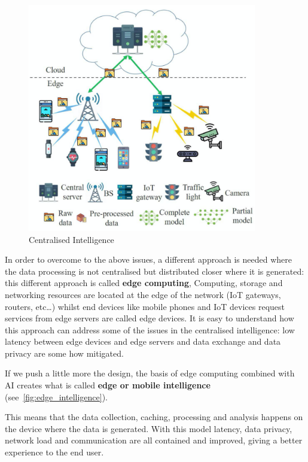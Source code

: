 \begin{figure}[ht]
    \includegraphics[width=10cm]{images/introduction/centralised_intelligence.png}
    \centering
    \caption{Centralised Intelligence}\label{fig:centralised_intelligence}
\end{figure}

In order to overcome to the above issues, a different approach is needed where
the data processing is not centralised but distributed closer where it is
generated: this different approach is called \textbf{edge computing},
Computing, storage and networking resources are located at the edge of the
network (IoT gateways, routers, etc\ldots) whilst end devices like mobile
phones and IoT devices request services from edge servers are called edge
devices.
It is easy to understand how this approach can address some of the issues in
the centralised intelligence: low latency between edge devices and edge servers
and data exchange and data privacy are some how mitigated.

If we push a little more the design, the basis of edge computing combined with
AI creates what is called
\textbf{edge or mobile intelligence} (see~\ref{fig:edge_intelligence}).

This means that the data collection, caching, processing and analysis happens
on the device where the data is generated.
With this model latency, data privacy, network load and communication are all
contained and improved, giving a better experience to the end user.

